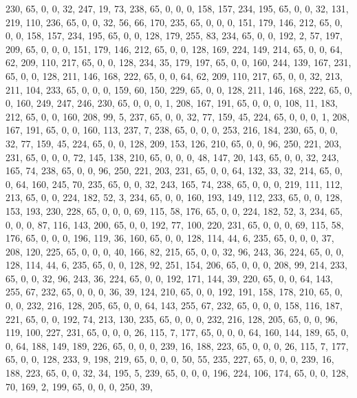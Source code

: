 \begin{DoxyCode}
       230, 65, 0, 0, 32, 247, 19, 73, 238, 65, 0, 0, 0, 158, 157, 234, 195, 65, 0, 0, 32, 131, 219, 110, 236, 65,
       0, 0, 32, 56, 66, 170, 235, 65, 0, 0, 0, 151, 179, 146, 212, 65, 0, 0, 0, 158, 157, 234, 195, 65, 0, 0,
       128, 179, 255, 83, 234, 65, 0, 0, 192, 2, 57, 197, 209, 65, 0, 0, 0, 151, 179, 146, 212, 65, 0, 0, 128, 169,
       224, 149, 214, 65, 0, 0, 64, 62, 209, 110, 217, 65, 0, 0, 128, 234, 35, 179, 197, 65, 0, 0, 160, 244, 139,
       167, 231, 65, 0, 0, 128, 211, 146, 168, 222, 65, 0, 0, 64, 62, 209, 110, 217, 65, 0, 0, 32, 213, 211, 104, 233,
       65, 0, 0, 0, 159, 60, 150, 229, 65, 0, 0, 128, 211, 146, 168, 222, 65, 0, 0, 160, 249, 247, 246, 230, 65,
       0, 0, 0, 1, 208, 167, 191, 65, 0, 0, 0, 108, 11, 183, 212, 65, 0, 0, 160, 208, 99, 5, 237, 65, 0, 0, 32, 77,
       159, 45, 224, 65, 0, 0, 0, 1, 208, 167, 191, 65, 0, 0, 160, 113, 237, 7, 238, 65, 0, 0, 0, 253, 216, 184,
       230, 65, 0, 0, 32, 77, 159, 45, 224, 65, 0, 0, 128, 209, 153, 126, 210, 65, 0, 0, 96, 250, 221, 203, 231, 65,
       0, 0, 0, 72, 145, 138, 210, 65, 0, 0, 0, 48, 147, 20, 143, 65, 0, 0, 32, 243, 165, 74, 238, 65, 0, 0, 96,
       250, 221, 203, 231, 65, 0, 0, 64, 132, 33, 32, 214, 65, 0, 0, 64, 160, 245, 70, 235, 65, 0, 0, 32, 243, 165,
       74, 238, 65, 0, 0, 0, 219, 111, 112, 213, 65, 0, 0, 224, 182, 52, 3, 234, 65, 0, 0, 160, 193, 149, 112, 233,
       65, 0, 0, 128, 153, 193, 230, 228, 65, 0, 0, 0, 69, 115, 58, 176, 65, 0, 0, 224, 182, 52, 3, 234, 65, 0, 0,
       0, 87, 116, 143, 200, 65, 0, 0, 192, 77, 100, 220, 231, 65, 0, 0, 0, 69, 115, 58, 176, 65, 0, 0, 0, 196,
       119, 36, 160, 65, 0, 0, 128, 114, 44, 6, 235, 65, 0, 0, 0, 37, 208, 120, 225, 65, 0, 0, 0, 40, 166, 82, 215,
       65, 0, 0, 32, 96, 243, 36, 224, 65, 0, 0, 128, 114, 44, 6, 235, 65, 0, 0, 128, 92, 251, 154, 206, 65, 0, 0, 0,
       208, 99, 214, 233, 65, 0, 0, 32, 96, 243, 36, 224, 65, 0, 0, 192, 171, 144, 39, 220, 65, 0, 0, 64, 143,
       255, 67, 232, 65, 0, 0, 0, 36, 39, 124, 210, 65, 0, 0, 192, 191, 158, 178, 210, 65, 0, 0, 0, 232, 216, 128,
       205, 65, 0, 0, 64, 143, 255, 67, 232, 65, 0, 0, 0, 158, 116, 187, 221, 65, 0, 0, 192, 74, 213, 130, 235, 65, 0,
       0, 0, 232, 216, 128, 205, 65, 0, 0, 96, 119, 100, 227, 231, 65, 0, 0, 0, 26, 115, 7, 177, 65, 0, 0, 0, 64,
       160, 144, 189, 65, 0, 0, 64, 188, 149, 189, 226, 65, 0, 0, 0, 239, 16, 188, 223, 65, 0, 0, 0, 26, 115, 7,
       177, 65, 0, 0, 128, 233, 9, 198, 219, 65, 0, 0, 0, 50, 55, 235, 227, 65, 0, 0, 0, 239, 16, 188, 223, 65, 0, 0,
       32, 34, 195, 5, 239, 65, 0, 0, 0, 196, 224, 106, 174, 65, 0, 0, 128, 70, 169, 2, 199, 65, 0, 0, 0, 250, 39,

\end{DoxyCode}

